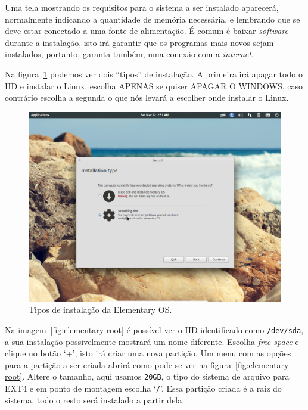 \documentclass{handout_utfpr}
\begin{document}
Uma tela mostrando os requisitos para o sistema a ser instalado aparecerá, normalmente indicando a quantidade de memória necessária, e lembrando que se deve estar conectado a uma fonte de alimentação.
É comum é baixar \textit{software} durante a instalação, isto irá garantir que os programas mais novos sejam instalados, portanto, garanta também, uma conexão com a \textit{internet}.

Na figura~\ref{fig:elementary-install} podemos ver dois ``tipos'' de instalação. A primeira irá apagar todo o HD e instalar o Linux, escolha APENAS se quiser APAGAR O WINDOWS, caso contrário escolha a segunda o que nós levará a escolher onde instalar o Linux.

\begin{figure}[h]
  \centering
  \includegraphics[scale=.3]{imagens/elementary-install-03.png}
  \caption{Tipos de instalação da Elementary OS\@.}
  \label{fig:elementary-install}
\end{figure}

Na imagem~\ref{fig:elementary-root} é possível ver o HD identificado como \texttt{/dev/sda}, a sua instalação possivelmente mostrará um nome diferente. Escolha \textit{free space} e clique no botão `+', isto irá criar uma nova partição. Um menu com as opções para a partição a ser criada abrirá como pode-se ver na figura~\ref{fig:elementary-root}. Altere o tamanho, aqui usamos \texttt{20GB}, o tipo do sistema de arquivo para EXT4 e em ponto de montagem escolha `\texttt{/}'. Essa partição criada é a raiz do sistema, todo o resto será instalado a partir dela.
\end{document}
